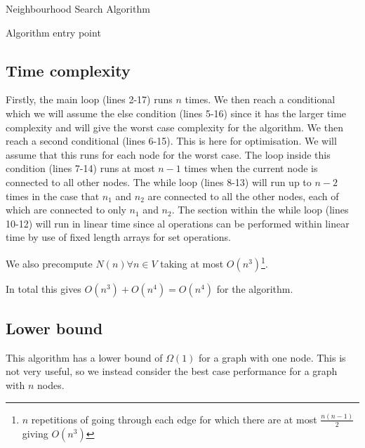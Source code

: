 \documentclass[11pt]{article}
\begin{document}
\begin{algorithm}
\caption{Neighbourhood Search Algorithm}\label{alg:main}
\end{algorithm}

\begin{algorithm}
\caption{Algorithm entry point}\label{alg:body}
\end{algorithm}

\subsection{Time complexity}


Firstly, the main loop (lines 2-17) runs $n$ times. We then reach a conditional which we will assume the else condition (lines 5-16) since it has the larger time complexity and will give the worst case complexity for the algorithm. We then reach a second conditional (lines 6-15). This is here for optimisation. We will assume that this runs for each node for the worst case. The loop inside this condition (lines 7-14) runs at most $n-1$ times when the current node is connected to all other nodes. The while loop (lines 8-13) will run up to $n-2$ times in the case that $n_1$ and $n_2$ are connected to all the other nodes, each of which are connected to only $n_1$ and $n_2$. The section within the while loop (lines 10-12) will run in linear time since al operations can be performed within linear time by use of fixed length arrays for set operations.

We also precompute $N(n)\forall n\in V$ taking at most $O(n^3)$\footnote{$n$ repetitions of going through each edge for which there are at most $\frac{n(n-1)}{2}$ giving $O(n^3)$}.

In total this gives $O(n^3)+O(n^4)=O(n^4)$ for the algorithm.

\subsection{Lower bound}
This algorithm has a lower bound of $\Omega(1)$ for a graph with one node. This is not very useful, so we instead consider the best case performance for a graph with $n$ nodes.\\
\end{document}
